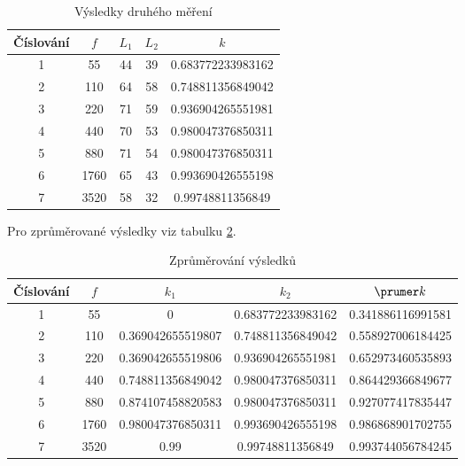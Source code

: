 \documentclass{fkssolpub}
\begin{document}
\begin{table}[h!]
  \caption{Výsledky druhého měření}
  \label{tab:2}
  \begin{center}
    \begin{tabular}{|c|c|c|c|c|}
      \hline
      Číslování & $f$ & $L_1$ & $L_2$ & $k$ \\
      \hline
      1 & 55 & 44 & 39 & 0.683772233983162 \\
      2 & 110 & 64 & 58 & 0.748811356849042 \\
      3 & 220 & 71 & 59 & 0.936904265551981 \\
      4 & 440 & 70 & 53 & 0.980047376850311 \\
      5 & 880 & 71 & 54 & 0.980047376850311 \\
      6 & 1760 & 65 & 43 & 0.993690426555198 \\
      7 & 3520 & 58 & 32 & 0.99748811356849 \\
      \hline
    \end{tabular}
  \end{center}
\end{table}

Pro zprůměrované výsledky viz tabulku \ref{tab:cel}.

\begin{table}[h!]
  \caption{Zprůměrování výsledků}
  \label{tab:cel}
  \begin{center}
    \begin{tabular}{|c|c|c|c|c|}
      \hline
      Číslování & $f$ & $k_1$ & $k_2$ & $\prumer k$ \\
      \hline
        1 & 55 & 0 & 0.683772233983162 & 0.341886116991581 \\
        2 & 110 & 0.369042655519807 & 0.748811356849042 & 0.558927006184425 \\
        3 & 220 & 0.369042655519806 & 0.936904265551981 & 0.652973460535893 \\
        4 & 440 & 0.748811356849042 & 0.980047376850311 & 0.864429366849677 \\
        5 & 880 & 0.874107458820583 & 0.980047376850311 & 0.927077417835447 \\
        6 & 1760 & 0.980047376850311 & 0.993690426555198 & 0.986868901702755 \\
        7 & 3520 & 0.99 & 0.99748811356849 & 0.993744056784245 \\
      \hline
    \end{tabular}
  \end{center}
\end{table}
\end{document}
